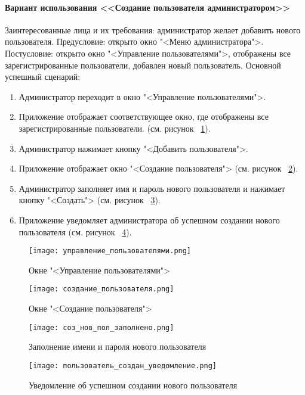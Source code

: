 \paragraph{Вариант использования <<Создание пользователя администратором>>}

Заинтересованные лица и их требования: администратор желает добавить нового пользователя.
\newline Предусловие: открыто окно "<Меню администратора">.
\newline Постусловие: открыто окно "<Управление пользователями">, отображены все зарегистрированные пользователи, добавлен новый пользователь.
\newline Основной успешный сценарий:
\begin{enumerate}
	\item Администратор переходит в окно "<Управление пользователями">.
	\item Приложение отображает соответствующее окно, где отображены все зарегистрированные пользователи. (см. рисунок ~\ref{users:image}).
	\item Администратор нажимает кнопку "<Добавить пользователя">.
	\item Приложение отображает окно "<Создание пользователя"> (см. рисунок ~\ref{create_user:image}).
	\item Администратор заполняет имя и пароль нового пользователя и нажимает кнопку "<Создать"> (см. рисунок ~\ref{created_user:image}).
	\item Приложение уведомляет администратора об успешном создании нового пользователя (см. рисунок ~\ref{notification_user_created:image}).
\end{enumerate}

\begin{figure}[H]
	\centering
	\texttt{[image: управление\_пользователями.png]}
	\caption{Окне "<Управление пользователями">}
	\label{users:image}
\end{figure}
\begin{figure}[H]
	\centering
	\texttt{[image: создание\_пользователя.png]}
	\caption{Окне "<Создание пользователя">}
	\label{create_user:image}
\end{figure}
\begin{figure}[H]
	\centering
	\texttt{[image: соз\_нов\_пол\_заполнено.png]}
	\caption{Заполнение имени и пароля нового пользователя}
	\label{created_user:image}
\end{figure}
\begin{figure}[H]
	\centering
	\texttt{[image: пользователь\_создан\_уведомление.png]}
	\caption{Уведомление об успешном создании нового пользователя}
	\label{notification_user_created:image}
\end{figure}

